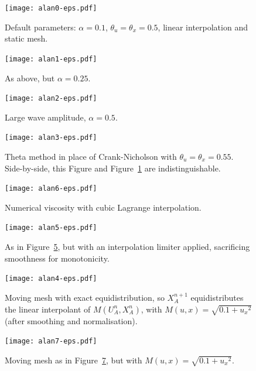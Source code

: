 \documentclass{article}
\begin{document}
\begin{figure}[htbp]
\centering
  \texttt{[image: alan0-eps.pdf]}
  \caption{Default parameters: $\alpha = 0.1$, $\theta_u = \theta_x = 0.5$,
  linear interpolation and static mesh.
  \label{fig:alan0-eps}}
\end{figure}
\begin{figure}[hbtp]
\centering
  \texttt{[image: alan1-eps.pdf]}
  \caption{As above, but $\alpha = 0.25$.
  \label{fig:alan1-eps}}
\end{figure}
\begin{figure}[htbp]
\centering
  \texttt{[image: alan2-eps.pdf]}
  \caption{Large wave amplitude, $\alpha = 0.5$.
  \label{fig:alan2-eps}}
\end{figure}
\begin{figure}[hbtp]
\centering
  \texttt{[image: alan3-eps.pdf]}
  \caption{Theta method in place of Crank-Nicholson with $\theta_u = \theta_x = 0.55$.
    Side-by-side, this Figure and Figure~\ref{fig:alan0-eps} are indistinguishable.
  \label{fig:alan3-eps}}
\end{figure}
\begin{figure}[htbp]
\centering
  \texttt{[image: alan6-eps.pdf]}
  \caption{Numerical viscosity with cubic Lagrange interpolation.
  \label{fig:alan6-eps}}
\end{figure}
\begin{figure}[hbtp]
\centering
  \texttt{[image: alan5-eps.pdf]}
  \caption{As in Figure~\ref{fig:alan6-eps}, but with an interpolation limiter
  applied, sacrificing smoothness for monotonicity.
  \label{fig:alan5-eps}}
\end{figure}
\begin{figure}[htbp]
\centering
  \texttt{[image: alan4-eps.pdf]}
  \caption{Moving mesh with exact equidistribution, so $X_A^{n+1}$
    equidistributes the linear interpolant of $M(U^n_A,X^n_A)$, with
    $M(u,x) = \sqrt{0.1 + {u_x}^2}$ (after smoothing and normalisation).
  \label{fig:alan4-eps}}
\end{figure}
\begin{figure}[hbtp]
\centering
  \texttt{[image: alan7-eps.pdf]}
  \caption{Moving mesh as in Figure~\ref{fig:alan4-eps}, but with
  $M(u,x) = \sqrt{0.1 + {u_x}^2}$.
  \label{fig:alan7-eps}}
\end{figure}
\end{document}
